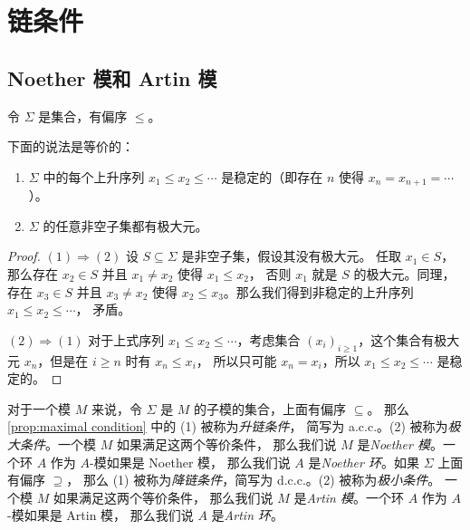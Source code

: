 \chapter{链条件}

\section{Noether 模和 Artin 模}

令 $\Sigma$ 是集合，有偏序 $\leq$。

\begin{proposition}\label{prop:maximal condition}
  下面的说法是等价的：
  \begin{enumerate}
    \item $\Sigma$ 中的每个上升序列 $x_1\leq x_2\leq\cdots$ 是稳定的（即存在 $n$ 使得 $x_n=x_{n+1}=\cdots$）。
    \item $\Sigma$ 的任意非空子集都有极大元。
  \end{enumerate}
\end{proposition}
\begin{proof}
  $(1)\Rightarrow (2)$ 设 $S\subseteq\Sigma$ 是非空子集，假设其没有极大元。
  任取 $x_1\in S$，那么存在 $x_2\in S$ 并且 $x_1\neq x_2$ 使得 $x_1\leq x_2$，
  否则 $x_1$ 就是 $S$ 的极大元。同理，存在 $x_3\in S$ 并且 $x_3\neq x_2$
  使得 $x_2\leq x_3$。那么我们得到非稳定的上升序列 $x_1\leq x_2\leq \cdots$，
  矛盾。

  $(2)\Rightarrow (1)$ 对于上式序列 $x_1\leq x_2\leq \cdots$，考虑集合
  $(x_i)_{i\geq 1}$，这个集合有极大元 $x_n$，但是在 $i\geq n$ 时有 $x_n\leq x_i$，
  所以只可能 $x_n=x_i$，所以 $x_1\leq x_2\leq \cdots$ 是稳定的。
\end{proof}

对于一个模 $M$ 来说，令 $\Sigma$ 是 $M$ 的子模的集合，上面有偏序 $\subseteq$。
那么 \autoref{prop:maximal condition} 中的 (1) 被称为\emph{升链条件}，
简写为 a.c.c.。(2) 被称为\emph{极大条件}。一个模 $M$ 如果满足这两个等价条件，
那么我们说 $M$ 是\emph{Noether 模}。一个环 $A$ 作为 $A$-模如果是 Noether 模，
那么我们说 $A$ 是\emph{Noether 环}。如果 $\Sigma$ 上面有偏序 $\supseteq$，
那么 (1) 被称为\emph{降链条件}，简写为 d.c.c.。(2) 被称为\emph{极小条件}。
一个模 $M$ 如果满足这两个等价条件，
那么我们说 $M$ 是\emph{Artin 模}。一个环 $A$ 作为 $A$-模如果是 Artin 模，
那么我们说 $A$ 是\emph{Artin 环}。


